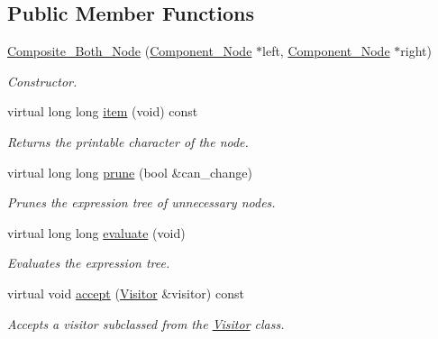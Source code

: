 \subsection*{Public Member Functions}
\begin{DoxyCompactItemize}
\item 
\hyperlink{classMadara_1_1Expression__Tree_1_1Composite__Both__Node_a06c5b933841d796599999dd28f02eeaf}{Composite\_\-Both\_\-Node} (\hyperlink{classMadara_1_1Expression__Tree_1_1Component__Node}{Component\_\-Node} $\ast$left, \hyperlink{classMadara_1_1Expression__Tree_1_1Component__Node}{Component\_\-Node} $\ast$right)
\begin{DoxyCompactList}\small\item\em Constructor. \item\end{DoxyCompactList}\item 
virtual long long \hyperlink{classMadara_1_1Expression__Tree_1_1Composite__Both__Node_a29b648222c9a6cf9d1ac504ddd5c35e7}{item} (void) const 
\begin{DoxyCompactList}\small\item\em Returns the printable character of the node. \item\end{DoxyCompactList}\item 
virtual long long \hyperlink{classMadara_1_1Expression__Tree_1_1Composite__Both__Node_a9ffef2b8c0f5fc025ffc9ddd04f65844}{prune} (bool \&can\_\-change)
\begin{DoxyCompactList}\small\item\em Prunes the expression tree of unnecessary nodes. \item\end{DoxyCompactList}\item 
virtual long long \hyperlink{classMadara_1_1Expression__Tree_1_1Composite__Both__Node_a0a51ded8431f786d923d9b7dc59c3326}{evaluate} (void)
\begin{DoxyCompactList}\small\item\em Evaluates the expression tree. \item\end{DoxyCompactList}\item 
virtual void \hyperlink{classMadara_1_1Expression__Tree_1_1Composite__Both__Node_a2d20ccb951c3da415e8a9b4f352766d2}{accept} (\hyperlink{classMadara_1_1Expression__Tree_1_1Visitor}{Visitor} \&visitor) const 
\begin{DoxyCompactList}\small\item\em Accepts a visitor subclassed from the \hyperlink{classMadara_1_1Expression__Tree_1_1Visitor}{Visitor} class. \item\end{DoxyCompactList}\item 

\end{DoxyCompactItemize}
